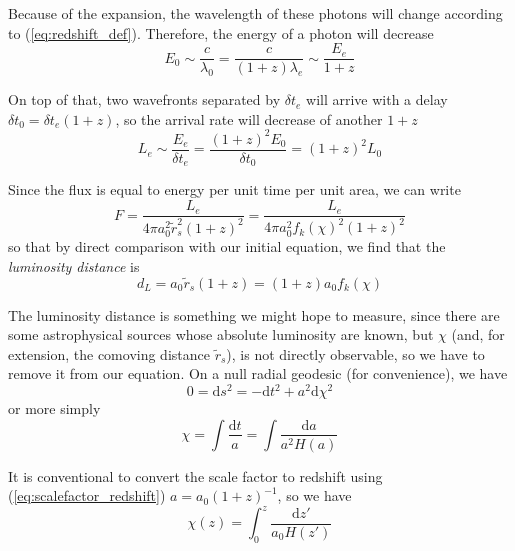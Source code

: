 \par Because of the expansion, the wavelength of these photons will change according to (\ref{eq:redshift_def}). Therefore, the energy of a photon will decrease
\begin{equation*}
    E_{0} \sim \frac{c}{\lambda_{0}} = \frac{c}{(1+z)\lambda_{e}} \sim \frac{E_{e}}{1+z}
\end{equation*}
\par On top of that, two wavefronts separated by $\delta t_{e}$ will arrive with a delay $\delta t_{0} = \delta t_{e}(1+z)$, so the arrival rate will decrease of another $1+z$
\begin{equation*}
    L_{e} \sim \frac{E_{e}}{\delta t_{e}} = \frac{(1+z)^{2}E_{0}}{\delta t_{0}} = (1+z)^{2}L_{0}
\end{equation*}
\par Since the flux is equal to energy per unit time per unit area, we can write
\begin{equation*}
    F = \frac{L_{e}}{4\pi a_{0}^{2}\tilde{r}_{s}^{2}(1+z)^{2}} = \frac{L_{e}}{4\pi a_{0}^{2}f_{k}(\chi)^{2}(1+z)^{2}}
\end{equation*}
so that by direct comparison with our initial equation, we find that the \emph{luminosity distance} is
\begin{equation}
    d_{L} = a_{0}\tilde{r}_{s}(1+z) = (1+z)a_{0}f_{k}(\chi)
    \label{eq:luminositydistance}
\end{equation}
\par The luminosity distance is something we might hope to measure, since there are some astrophysical sources whose absolute luminosity are known, but $\chi$ (and, for extension, the comoving distance $\tilde{r}_{s}$), is not directly observable, so we have to remove it from our equation. On a null radial geodesic (for convenience), we have
\begin{equation*}
    0 = \text{d}s^{2} = -\text{d}t^{2} + a^{2}\text{d}\chi^{2}
\end{equation*}
or more simply 
\begin{equation*}
    \chi = \int \frac{\text{d}t}{a} = \int \frac{\text{d}a}{a^{2}H(a)}
\end{equation*}
\par It is conventional to convert the scale factor to redshift using (\ref{eq:scalefactor_redshift}) $a = a_{0}(1+z)^{-1}$, so we have
\begin{equation*}
    \chi(z) = \int_{0}^{z}\frac{\text{d}z'}{a_{0}H(z')}
\end{equation*}
